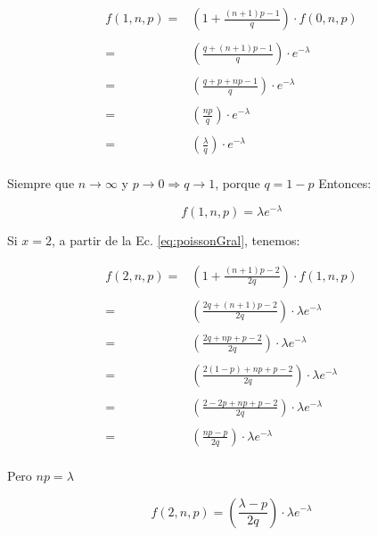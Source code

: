 \begin{equation}
  \begin{array}{rl}
  f(1,n,p)  = & (1 + \frac{(n+1)p - 1}{q}) \cdot f(0,n,p) \\
  \\
            = & (\frac{q + (n+1)p - 1}{q}) \cdot e^{-\lambda} \\
  \\
            = & (\frac{q + p + np - 1}{q}) \cdot e^{-\lambda} \\
  \\
            = & (\frac{np}{q}) \cdot e^{-\lambda} \\
  \\
            = & (\frac{\lambda}{q}) \cdot e^{-\lambda} \\
  \end{array}
\end{equation}

Siempre que $n \to \infty$ y $p \to 0 \Rightarrow q \to 1$, porque $q=1-p$
Entonces:

\begin{equation}
f(1,n,p) = \lambda e^{-\lambda}
\end{equation}

Si $x=2$, a partir de la Ec. \eqref{eq:poissonGral}, tenemos:

\begin{equation}
  \begin{array}{rl}
  f(2,n,p)  = & (1 + \frac{(n+1)p - 2}{2q}) \cdot f(1,n,p) \\
  \\
            = & (\frac{2q + (n+1)p - 2}{2q}) \cdot \lambda e^{-\lambda} \\
  \\
            = & (\frac{2q + np + p - 2}{2q}) \cdot \lambda e^{-\lambda} \\
  \\
            = & (\frac{2(1-p) + np + p - 2}{2q}) \cdot \lambda e^{-\lambda} \\
  \\
            = & (\frac{2 - 2p + np + p - 2}{2q}) \cdot \lambda e^{-\lambda} \\
  \\
            = & (\frac{np - p}{2q}) \cdot \lambda e^{-\lambda} \\
  \end{array}
\end{equation}

Pero $np=\lambda$

\begin{equation}
  f(2,n,p)  = (\frac{\lambda - p}{2q}) \cdot \lambda e^{-\lambda}
\end{equation}

